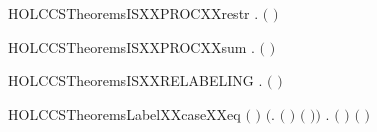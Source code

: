 \newcommand{\HOLCCSTheoremsISXXPROCXXrelab}{\UseVerbatim{HOLCCSTheoremsISXXPROCXXrelab}}
\begin{SaveVerbatim}{HOLCCSTheoremsISXXPROCXXrestr}
\HOLTokenTurnstile{} \HOLSymConst{\HOLTokenForall{}} .  \ensuremath{(}  \ensuremath{)} \HOLSymConst{\HOLTokenEquiv{}}  
\end{SaveVerbatim}
\newcommand{\HOLCCSTheoremsISXXPROCXXrestr}{\UseVerbatim{HOLCCSTheoremsISXXPROCXXrestr}}
\begin{SaveVerbatim}{HOLCCSTheoremsISXXPROCXXsum}
\HOLTokenTurnstile{} \HOLSymConst{\HOLTokenForall{}} .  \ensuremath{(} \HOLSymConst{\ensuremath{+}} \ensuremath{)} \HOLSymConst{\HOLTokenEquiv{}}   \HOLSymConst{\HOLTokenConj{}}  
\end{SaveVerbatim}
\newcommand{\HOLCCSTheoremsISXXPROCXXsum}{\UseVerbatim{HOLCCSTheoremsISXXPROCXXsum}}
\begin{SaveVerbatim}{HOLCCSTheoremsISXXRELABELING}
\HOLTokenTurnstile{} \HOLSymConst{\HOLTokenForall{}}.  \ensuremath{(} \ensuremath{)}
\end{SaveVerbatim}
\newcommand{\HOLCCSTheoremsISXXRELABELING}{\UseVerbatim{HOLCCSTheoremsISXXRELABELING}}
\begin{SaveVerbatim}{HOLCCSTheoremsLabelXXcaseXXeq}
\HOLTokenTurnstile{} \ensuremath{(}    \HOLSymConst{\ensuremath{=}} \ensuremath{)} \HOLSymConst{\HOLTokenEquiv{}}
   \ensuremath{(}\HOLSymConst{\HOLTokenExists{}}. \ensuremath{(} \HOLSymConst{\ensuremath{=}}  \ensuremath{)} \HOLSymConst{\HOLTokenConj{}} \ensuremath{(}  \HOLSymConst{\ensuremath{=}} \ensuremath{)}\ensuremath{)} \HOLSymConst{\HOLTokenDisj{}}
   \HOLSymConst{\HOLTokenExists{}}. \ensuremath{(} \HOLSymConst{\ensuremath{=}}  \ensuremath{)} \HOLSymConst{\HOLTokenConj{}} \ensuremath{(}  \HOLSymConst{\ensuremath{=}} \ensuremath{)}
\end{SaveVerbatim}
\newcommand{\HOLCCSTheoremsLabelXXcaseXXeq}{\UseVerbatim{HOLCCSTheoremsLabelXXcaseXXeq}}
